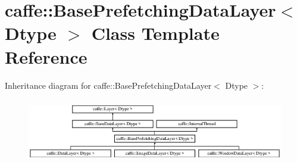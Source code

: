 \hypertarget{classcaffe_1_1BasePrefetchingDataLayer}{}\section{caffe\+:\+:Base\+Prefetching\+Data\+Layer$<$ Dtype $>$ Class Template Reference}
\label{classcaffe_1_1BasePrefetchingDataLayer}
Inheritance diagram for caffe\+:\+:Base\+Prefetching\+Data\+Layer$<$ Dtype $>$\+:\begin{figure}[H]
\begin{center}
\leavevmode
\includegraphics[height=2.828283cm]{classcaffe_1_1BasePrefetchingDataLayer}
\end{center}
\end{figure}
